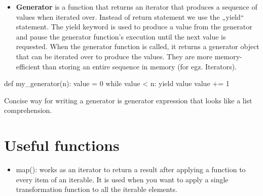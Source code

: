 \documentclass[
  letterpaper,
]{book}
\newenvironment{Shaded}{\begin{snugshade}}{\end{snugshade}}
\newcommand{\ControlFlowTok}[1]{\textcolor[rgb]{0.00,0.23,0.31}{#1}}
\newcommand{\DecValTok}[1]{\textcolor[rgb]{0.68,0.00,0.00}{#1}}
\newcommand{\KeywordTok}[1]{\textcolor[rgb]{0.00,0.23,0.31}{#1}}
\newcommand{\NormalTok}[1]{\textcolor[rgb]{0.00,0.23,0.31}{#1}}
\newcommand{\OperatorTok}[1]{\textcolor[rgb]{0.37,0.37,0.37}{#1}}
\providecommand{\tightlist}{%
  \setlength{\itemsep}{0pt}\setlength{\parskip}{0pt}}\usepackage{longtable,booktabs,array}
\begin{document}
\begin{itemize}
\tightlist
\item
  \textbf{Generator} is a function that returns an iterator that
  produces a sequence of values when iterated over. Instead of return
  statement we use the „yield`` statement. The yield keyword is used to
  produce a value from the generator and pause the generator function's
  execution until the next value is requested. When the generator
  function is called, it returns a generator object that can be iterated
  over to produce the values. They are more memory-efficient than
  storing an entire sequence in memory (for egz. Iterators).
\end{itemize}

\begin{Shaded}
\begin{Highlighting}[]
\KeywordTok{def}\NormalTok{ my\_generator(n):}
\NormalTok{    value }\OperatorTok{=} \DecValTok{0}
    \ControlFlowTok{while}\NormalTok{ value }\OperatorTok{\textless{}}\NormalTok{ n:}
        \ControlFlowTok{yield}\NormalTok{ value}
\NormalTok{        value }\OperatorTok{+=} \DecValTok{1}
\end{Highlighting}
\end{Shaded}

\begin{tcolorbox}[enhanced jigsaw, arc=.35mm, bottomtitle=1mm, opacitybacktitle=0.6, bottomrule=.15mm, toptitle=1mm, title=\textcolor{quarto-callout-tip-color}{\faLightbulb}\hspace{0.5em}{Tip}, colbacktitle=quarto-callout-tip-color!10!white, toprule=.15mm, colback=white, opacityback=0, rightrule=.15mm, breakable, titlerule=0mm, left=2mm, leftrule=.75mm, colframe=quarto-callout-tip-color-frame, coltitle=black]

Concise way for writing a generator is generator expression that looks
like a list comprehension.

\end{tcolorbox}

\hypertarget{useful-functions}{%
\section{Useful functions}\label{useful-functions}}

\begin{itemize}
\tightlist
\item
  map(): works as an iterator to return a result after applying a
  function to every item of an iterable. It is used when you want to
  apply a single transformation function to all the iterable elements.
\end{itemize}
\end{document}

